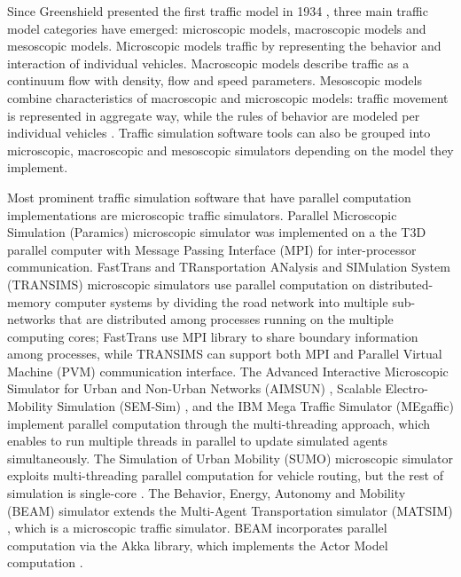 
Since Greenshield presented the first traffic model in 1934 \cite{greenshields1934photographic}, three main traffic model categories have emerged: microscopic models, macroscopic models and mesoscopic models. Microscopic models traffic by representing the behavior and interaction of individual vehicles. Macroscopic models describe traffic as a continuum flow with density, flow and speed parameters. Mesoscopic models combine characteristics of macroscopic and microscopic models: traffic movement is represented in aggregate way, while the rules of behavior are modeled per individual vehicles \cite{van2015traffic}. Traffic simulation software tools can also be grouped into microscopic, macroscopic and mesoscopic simulators depending on the model they implement. 

Most prominent traffic simulation software that have parallel computation implementations are microscopic traffic simulators. Parallel Microscopic Simulation (Paramics) \cite{cameron1996paramics} microscopic simulator was implemented on a the T3D parallel computer with Message Passing Interface (MPI) for inter-processor communication. FastTrans \cite{thulasidasan2009accelerating} and TRansportation ANalysis and SIMulation System (TRANSIMS) \cite{nagel2001parallel} microscopic simulators use parallel computation on distributed-memory
computer systems by dividing the road network into multiple sub-networks that are distributed among processes running on the multiple computing cores; FastTrans use MPI library to share boundary information among processes, while TRANSIMS can support
both MPI and Parallel Virtual Machine (PVM) communication interface. The Advanced Interactive Microscopic Simulator for Urban and Non-Urban Networks (AIMSUN) \cite{ferrer1993aimsun2}, Scalable Electro-Mobility Simulation (SEM-Sim) \cite{aydt2013multi}, and the IBM Mega Traffic Simulator (MEgaffic) \cite{osogami2012research} implement parallel computation through the multi-threading approach, which enables to run multiple threads in parallel to update simulated agents simultaneously. The Simulation of Urban Mobility (SUMO) microscopic simulator
exploits multi-threading parallel computation for vehicle routing,
but the rest of simulation is single-core \cite{behrisch2011sumo}.
The Behavior, Energy, Autonomy and Mobility (BEAM) simulator \cite{aboutBeam} extends the Multi-Agent Transportation simulator (MATSIM) \cite{horni2016multi}, which is a microscopic traffic simulator. BEAM incorporates parallel computation via the Akka \cite{akka} library, which implements the Actor Model computation \cite{actorModel}. 

